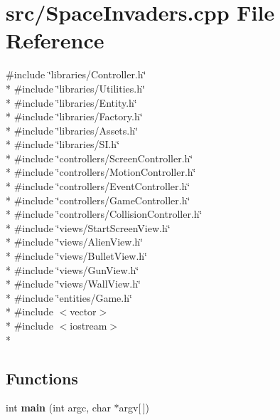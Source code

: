 \section{src/\-Space\-Invaders.cpp File Reference}
\label{_space_invaders_8cpp}
{\ttfamily \#include \char`\"{}libraries/\-Controller.\-h\char`\"{}}\\*
{\ttfamily \#include \char`\"{}libraries/\-Utilities.\-h\char`\"{}}\\*
{\ttfamily \#include \char`\"{}libraries/\-Entity.\-h\char`\"{}}\\*
{\ttfamily \#include \char`\"{}libraries/\-Factory.\-h\char`\"{}}\\*
{\ttfamily \#include \char`\"{}libraries/\-Assets.\-h\char`\"{}}\\*
{\ttfamily \#include \char`\"{}libraries/\-S\-I.\-h\char`\"{}}\\*
{\ttfamily \#include \char`\"{}controllers/\-Screen\-Controller.\-h\char`\"{}}\\*
{\ttfamily \#include \char`\"{}controllers/\-Motion\-Controller.\-h\char`\"{}}\\*
{\ttfamily \#include \char`\"{}controllers/\-Event\-Controller.\-h\char`\"{}}\\*
{\ttfamily \#include \char`\"{}controllers/\-Game\-Controller.\-h\char`\"{}}\\*
{\ttfamily \#include \char`\"{}controllers/\-Collision\-Controller.\-h\char`\"{}}\\*
{\ttfamily \#include \char`\"{}views/\-Start\-Screen\-View.\-h\char`\"{}}\\*
{\ttfamily \#include \char`\"{}views/\-Alien\-View.\-h\char`\"{}}\\*
{\ttfamily \#include \char`\"{}views/\-Bullet\-View.\-h\char`\"{}}\\*
{\ttfamily \#include \char`\"{}views/\-Gun\-View.\-h\char`\"{}}\\*
{\ttfamily \#include \char`\"{}views/\-Wall\-View.\-h\char`\"{}}\\*
{\ttfamily \#include \char`\"{}entities/\-Game.\-h\char`\"{}}\\*
{\ttfamily \#include $<$vector$>$}\\*
{\ttfamily \#include $<$iostream$>$}\\*
\subsection*{Functions}
\begin{DoxyCompactItemize}
\item 
int {\bf main} (int argc, char $\ast$argv[$\,$])
\end{DoxyCompactItemize}


